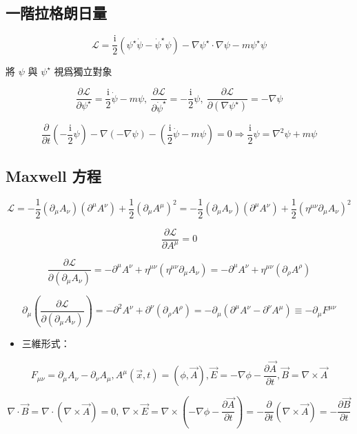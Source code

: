 \documentclass{article}
\begin{document}
\subsection{一階拉格朗日量}

$$\mathcal{L}=\frac{\mathrm{i}}{2}(\psi^{\star}\dot{\psi}-\dot{\psi}^{\star}\psi)-\nabla\psi^{\star}\cdot\nabla\psi-m\psi^{\star}\psi$$

將 $\psi$ 與 $\psi^{\star}$ 視爲獨立對象

$$\frac{\partial\mathcal{L}}{\partial\psi^{\star}}=\frac{\mathrm{i}}{2}\dot{\psi}-m\psi,\ \frac{\partial\mathcal{L}}{\partial\dot{\psi}^{\star}}=-\frac{\mathrm{i}}{2}\psi,\ \frac{\partial\mathcal{L}}{\partial(\nabla\psi^{\star})}=-\nabla\psi$$

$$\frac{\partial}{\partial t}(-\frac{\mathrm{i}}{2}\psi)-\nabla(-\nabla\psi)-(\frac{\mathrm{i}}{2}\dot{\psi}-m\psi)=0\Rightarrow\frac{\mathrm{i}}{2}\psi=\nabla^2\psi+m\psi$$

\subsection{Maxwell 方程}

$$\mathcal{L}=-\frac{1}{2}(\partial_{\mu}A_{\nu})(\partial^{\mu}A^{\nu})+\frac{1}{2}(\partial_{\mu}A^{\mu})^2=-\frac{1}{2}(\partial_{\mu}A_{\nu})(\partial^{\mu}A^{\nu})+\frac{1}{2}(\eta^{\mu\nu}\partial_{\mu}A_{\nu})^2$$

$$\frac{\partial\mathcal{L}}{\partial A^{\mu}}=0$$

$$\frac{\partial\mathcal{L}}{\partial(\partial_{\mu}A_{\nu})}=-\partial^{\mu}A^{\nu}+\eta^{\mu\nu}(\eta^{\mu\nu}\partial_{\mu}A_{\nu})=-\partial^{\mu}A^{\nu}+\eta^{\mu\nu}(\partial_{\rho}A^{\rho})$$

$$\partial_{\mu}(\frac{\partial\mathcal{L}}{\partial(\partial_{\mu}A_{\nu})})=-\partial^2A^{\nu}+\partial^{\nu}(\partial_{\rho}A^{\rho})=-\partial_{\mu}(\partial^{\mu}A^{\nu}-\partial^{\nu}A^{\mu})\equiv-\partial_{\mu}F^{\mu\nu}$$

\begin{itemize}
  \item 三維形式：
\end{itemize}

$$F_{\mu\nu}=\partial_{\mu}A_{\nu}-\partial_{\nu}A_{\mu},A^{\mu}(\vec{x},t)=(\phi,\vec{A}),\vec{E}=-\nabla\phi-\frac{\partial\vec{A}}{\partial t},\vec{B}=\nabla\times\vec{A}$$

$$\nabla\cdot\vec{B}=\nabla\cdot(\nabla\times\vec{A})=0,\ \nabla\times\vec{E}=\nabla\times(-\nabla\phi-\frac{\partial\vec{A}}{\partial t})=-\frac{\partial}{\partial t}(\nabla\times\vec{A})=-\frac{\partial\vec{B}}{\partial t}$$
\end{document}
